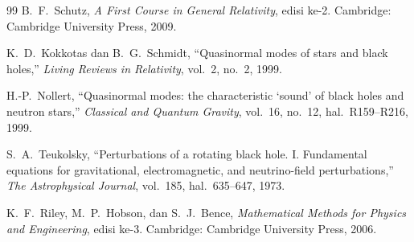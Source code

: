 \begin{thebibliography}{99}
B.~F.~Schutz, \textit{A First Course in General Relativity}, edisi ke-2.
Cambridge: Cambridge University Press, 2009.

K.~D.~Kokkotas dan B.~G.~Schmidt, ``Quasinormal modes of stars and black holes,''
\textit{Living Reviews in Relativity}, vol.~2, no.~2, 1999.

H.-P.~Nollert, ``Quasinormal modes: the characteristic `sound' of black holes and
neutron stars,'' \textit{Classical and Quantum Gravity}, vol.~16, no.~12,
hal.~R159--R216, 1999.

S.~A.~Teukolsky, ``Perturbations of a rotating black hole. I. Fundamental equations
for gravitational, electromagnetic, and neutrino-field perturbations,''
\textit{The Astrophysical Journal}, vol.~185, hal.~635--647, 1973.

K.~F.~Riley, M.~P.~Hobson, dan S.~J.~Bence, \textit{Mathematical Methods for
Physics and Engineering}, edisi ke-3.
Cambridge: Cambridge University Press, 2006.

\end{thebibliography}
\endgroup
